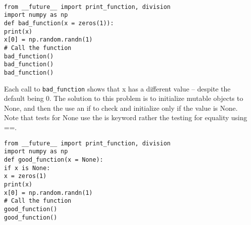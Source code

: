 \documentclass[KSmain.tex]{subfiles}
\begin{document}
\begin{framed}
\begin{verbatim}

from __future__ import print_function, division
import numpy as np
def bad_function(x = zeros(1)):
print(x)
x[0] = np.random.randn(1)
# Call the function
bad_function()
bad_function()
bad_function()
\end{verbatim}
\end{framed}
Each call to \texttt{bad\_function} shows that x has a different value – despite the default being 0. The solution
to this problem is to initialize mutable objects to None, and then the use an if to check and initialize only
if the value is None. Note that tests for None use the is keyword rather the testing for equality using ==.
\begin{framed}
\begin{verbatim}
from __future__ import print_function, division
import numpy as np
def good_function(x = None):
if x is None:
x = zeros(1)
print(x)
x[0] = np.random.randn(1)
# Call the function
good_function()
good_function()
\end{verbatim}
\end{framed}
\end{document}
